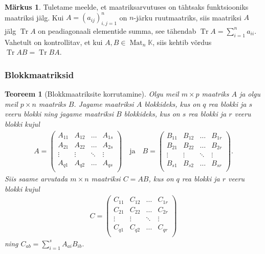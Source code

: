 \documentclass[12pt,a4paper,oneside]{article}
\theoremstyle{plain}
\newtheorem{teoreem}{Teoreem}[section]
\theoremstyle{definition}
\newtheorem{markus}{Märkus}[section]
\numberwithin{equation}{section}
\def\K{{\mathbb K}}
\DeclareMathOperator{\Mat}{Mat}
\DeclareMathOperator{\Tr}{Tr}
\begin{document}
\begin{markus} \label{markus:trace}
Tuletame meelde, et maatriksarvutuses on tähtsaks funktsiooniks  
maatriksi jälg. Kui $A=(a_{ij})_{i,j = 1}^{n}$ on $n$-järku 
ruutmaatriks, siis maatriksi $A$ jälg $\Tr A$ on peadiagonaali 
elementide summa, see tähendab $\Tr A=\sum_{i = 1}^{n} a_{ii}$. 
Vahetult on kontrollitav, et kui $A,B \in \Mat_n \K$, siis kehtib 
võrdus $\Tr AB= \Tr BA$.
\end{markus}

\subsubsection*{Blokkmaatriksid}

\begin{teoreem}[Blokkmaatriksite korrutamine]
Olgu meil $m \times p$ maatriks $A$ ja olgu meil $p \times n$ maatriks 
$B$. Jagame maatriksi $A$ blokkideks, kus on $q$ rea blokki ja $s$ 
veeru blokki ning jagame maatriksi $B$ blokkideks, kus on $s$ rea 
blokki ja $r$ veeru blokki kujul
\begin{align*}
A = \begin{pmatrix}
A_{11} & A_{12} & \dots & A_{1s} \\
A_{21} & A_{22} & \dots & A_{2s} \\
\vdots & \vdots & \ddots & \vdots \\
A_{q1} & A_{q2} & \dots & A_{qs} \\
\end{pmatrix} \quad \text{ja} \quad
B = \begin{pmatrix}
B_{11} & B_{12} & \dots & B_{1r} \\
B_{21} & B_{22} & \dots & B_{2r} \\
\vdots & \vdots & \ddots & \vdots \\
B_{s1} & B_{s2} & \dots & B_{sr} \\
\end{pmatrix}.
\end{align*}
Siis saame arvutada $m \times n$ maatriksi $C = AB$, kus on $q$ rea 
blokki ja $r$ veeru blokki kujul
\begin{align*}
C = \begin{pmatrix}
C_{11} & C_{12} & \dots & C_{1r} \\
C_{21} & C_{22} & \dots & C_{2r} \\
\vdots & \vdots & \ddots & \vdots \\
C_{q1} & C_{q2} & \dots & C_{qr} \\
\end{pmatrix}
\end{align*}
ning $C_{ab} = \sum_{i = 1}^{s} A_{ai} B_{ib}$.
\end{teoreem}
\end{document}
